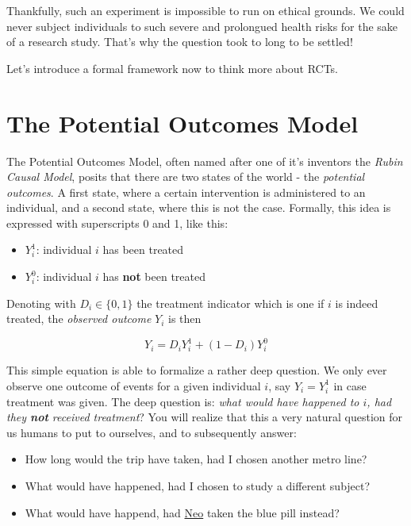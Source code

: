 \documentclass[]{book}
\providecommand{\tightlist}{%
  \setlength{\itemsep}{0pt}\setlength{\parskip}{0pt}}
\begin{document}
Thankfully, such an experiment is impossible to run on ethical grounds. We could never subject individuals to such severe and prolongued health risks for the sake of a research study. That's why the question took to long to be settled!

Let's introduce a formal framework now to think more about RCTs.

\hypertarget{rubin}{%
\section{The Potential Outcomes Model}\label{rubin}}

The Potential Outcomes Model, often named after one of it's inventors the \emph{Rubin Causal Model}, posits that there are two states of the world - the \emph{potential outcomes}. A first state, where a certain intervention is administered to an individual, and a second state, where this is not the case. Formally, this idea is expressed with superscripts 0 and 1, like this:

\begin{itemize}
\tightlist
\item
  \(Y_i^1\): individual \(i\) has been treated
\item
  \(Y_i^0\): individual \(i\) has \textbf{not} been treated
\end{itemize}

Denoting with \(D_i \in \{0,1\}\) the treatment indicator which is one if \(i\) is indeed treated, the \emph{observed outcome} \(Y_i\) is then

\begin{equation}
Y_i = D_i Y_i^1 + (1-D_i)Y_i^0 \label{eq:rubin-model}
\end{equation}

This simple equation is able to formalize a rather deep question. We only ever observe one outcome of events for a given individual \(i\), say \(Y_i = Y_i^1\) in case treatment was given. The deep question is: \emph{what would have happened to \(i\), had they \textbf{not} received treatment}? You will realize that this a very natural question for us humans to put to ourselves, and to subsequently answer:

\begin{itemize}
\tightlist
\item
  How long would the trip have taken, had I chosen another metro line?
\item
  What would have happened, had I chosen to study a different subject?
\item
  What would have happend, had \href{https://en.wikipedia.org/wiki/Neo_(The_Matrix)}{Neo} taken the blue pill instead?
\end{itemize}
\end{document}
